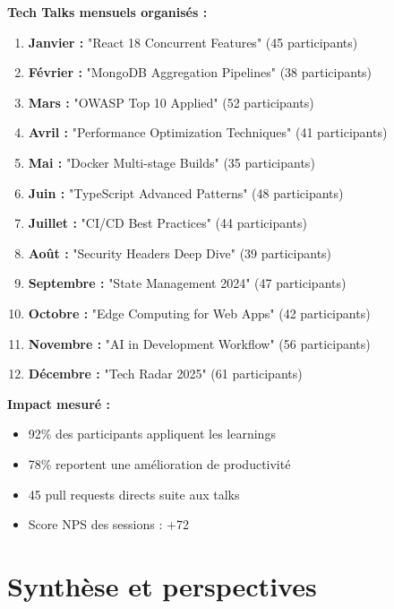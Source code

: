 \begin{tcolorbox}[colback=yellow!5!white,colframe=yellow!60!black,title=\textbf{Programme de knowledge sharing 2024}]
\textbf{Tech Talks mensuels organisés :}
\begin{enumerate}
    \item \textbf{Janvier :} "React 18 Concurrent Features" (45 participants)
    \item \textbf{Février :} "MongoDB Aggregation Pipelines" (38 participants)
    \item \textbf{Mars :} "OWASP Top 10 Applied" (52 participants)
    \item \textbf{Avril :} "Performance Optimization Techniques" (41 participants)
    \item \textbf{Mai :} "Docker Multi-stage Builds" (35 participants)
    \item \textbf{Juin :} "TypeScript Advanced Patterns" (48 participants)
    \item \textbf{Juillet :} "CI/CD Best Practices" (44 participants)
    \item \textbf{Août :} "Security Headers Deep Dive" (39 participants)
    \item \textbf{Septembre :} "State Management 2024" (47 participants)
    \item \textbf{Octobre :} "Edge Computing for Web Apps" (42 participants)
    \item \textbf{Novembre :} "AI in Development Workflow" (56 participants)
    \item \textbf{Décembre :} "Tech Radar 2025" (61 participants)
\end{enumerate}

\textbf{Impact mesuré :}
\begin{itemize}
    \item 92\% des participants appliquent les learnings
    \item 78\% reportent une amélioration de productivité
    \item 45 pull requests directs suite aux talks
    \item Score NPS des sessions : +72
\end{itemize}
\end{tcolorbox}

\section{Synthèse et perspectives}

